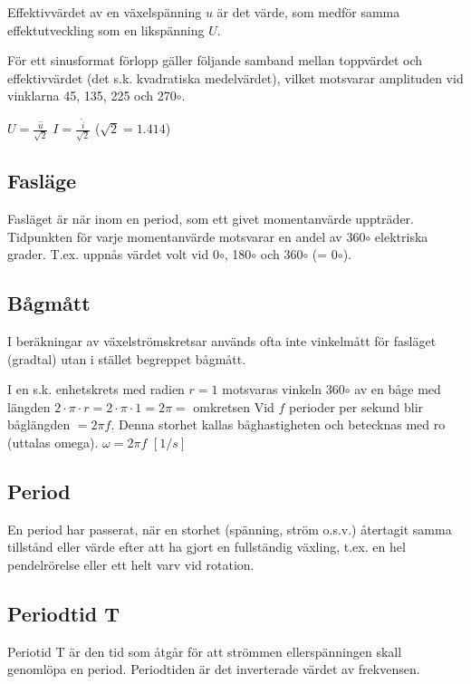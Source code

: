 Effektivvärdet av en växelspänning $u$ är det värde, som medför samma effektutveckling
som en likspänning $U$.

För ett sinusformat förlopp gäller följande samband mellan toppvärdet och effektivvärdet
(det s.k. kvadratiska medelvärdet), vilket motsvarar amplituden vid vinklarna 45,
135, 225 och 270$\circ$.

$U=\frac{\hat{u}}{\sqrt{2}}$ $I=\frac{\hat{i}}{\sqrt{2}}$ ($\sqrt{2} = 1.414$)

\subsection{Fasläge}

Fasläget är när inom en period, som ett givet momentanvärde uppträder. Tidpunkten för
varje momentanvärde motsvarar en andel av 360$\circ$ elektriska grader. T.ex. uppnås
värdet volt vid 0$\circ$, 180$\circ$ och 360$\circ$ (= 0$\circ$).

\subsection{Bågmått}

I beräkningar av växelströmskretsar används ofta inte vinkelmått för fasläget (gradtal)
utan i stället begreppet bågmått.

I en s.k. enhetskrets med radien $r = 1$ motsvaras vinkeln 360$\circ$ av en båge med
längden $2 \cdot \pi \cdot r= 2 \cdot \pi \cdot 1 = 2 \pi =$ omkretsen
Vid $f$ perioder per sekund blir båglängden $= 2\pi f$. Denna storhet kallas båghastigheten
och betecknas med ro (uttalas omega).
$\omega= 2\pi f$ $[1/s]$

\subsection{Period}

En period har passerat, när en storhet (spänning, ström o.s.v.) återtagit samma tillstånd
eller värde efter att ha gjort en fullständig växling, t.ex. en hel pendelrörelse eller ett
helt varv vid rotation.

\subsection{Periodtid T}

Periotid T är den tid som åtgår för att strömmen ellerspänningen skall genomlöpa
en period. Periodtiden är det inverterade värdet av frekvensen.

